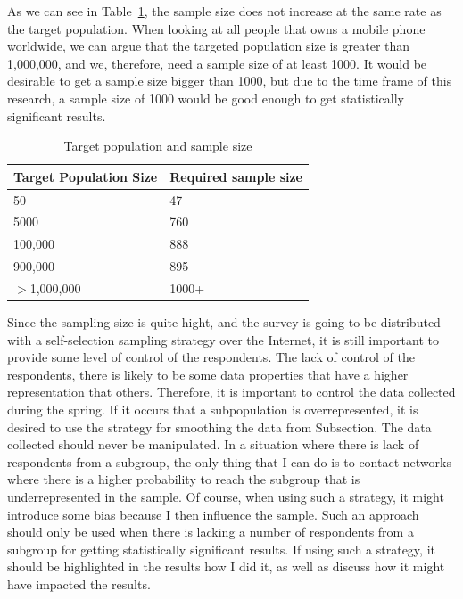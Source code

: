     As we can see in Table~\ref{tab:sampleSize}, the sample size does not increase at the same rate as the target population. When looking at all people that owns a mobile phone worldwide, we can argue that the targeted population size is greater than 1,000,000, and we, therefore, need a sample size of at least 1000. It would be desirable to get a sample size bigger than 1000, but due to the time frame of this research, a sample size of 1000 would be good enough to get statistically significant results.

      \begin{table}[H]
        \begin{tabular}{| p{5cm} | p{5cm} |}
          \hline
          {\bf Target Population Size} & {\bf Required sample size} \\ \hline
          50 & 47 \\
          5000 & 760 \\ 
          100,000 & 888 \\
          900,000 & 895 \\ 
          $>$1,000,000 & 1000+ \\ \hline
        \end{tabular}
        \caption{Target population and sample size \cite{empiriske}}
        \label{tab:sampleSize}
      \end{table}

    Since the sampling size is quite hight, and the survey is going to be distributed with a self-selection sampling strategy over the Internet, it is still important to provide some level of control of the respondents. The lack of control of the respondents, there is likely to be some data properties that have a higher representation that others. Therefore, it is important to control the data collected during the spring. If it occurs that a subpopulation is overrepresented, it is desired to use the strategy for smoothing the data from Subsection. The data collected should never be manipulated. In a situation where there is lack of respondents from a subgroup, the only thing that I can do is to contact networks where there is a higher probability to reach the subgroup that is underrepresented in the sample. Of course, when using such a strategy, it might introduce some bias because I then influence the sample. Such an approach should only be used when there is lacking a number of respondents from a subgroup for getting statistically significant results. If using such a strategy, it should be highlighted in the results how I did it, as well as discuss how it might have impacted the results. 

